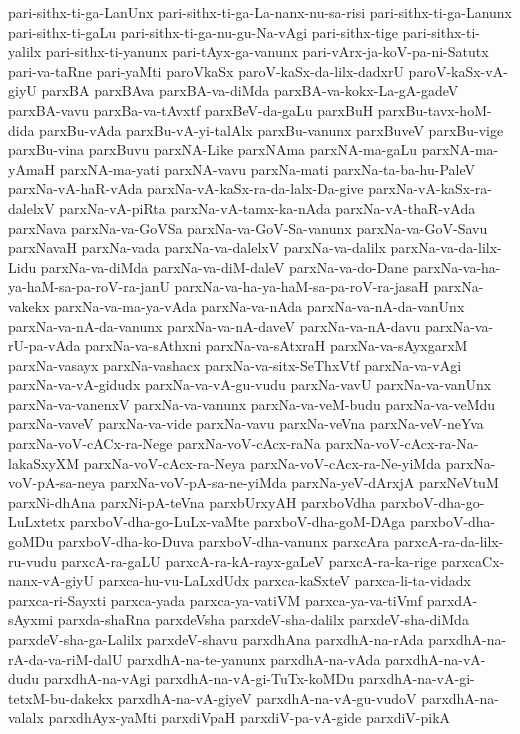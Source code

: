 {pari-sithx-ti-ga-LanUnx
pari-sithx-ti-ga-La-nanx-nu-sa-risi
pari-sithx-ti-ga-Lanunx
pari-sithx-ti-gaLu
pari-sithx-ti-ga-nu-gu-Na-vAgi
pari-sithx-tige
pari-sithx-ti-yalilx
pari-sithx-ti-yanunx
pari-tAyx-ga-vanunx
pari-vArx-ja-koV-pa-ni-Satutx
pari-va-taRne
pari-yaMti
paroVkaSx
paroV-kaSx-da-lilx-dadxrU
paroV-kaSx-vA-giyU
parxBA
parxBAva
parxBA-va-diMda
parxBA-va-kokx-La-gA-gadeV
parxBA-vavu
parxBa-va-tAvxtf
parxBeV-da-gaLu
parxBuH
parxBu-tavx-hoM-dida
parxBu-vAda
parxBu-vA-yi-talAlx
parxBu-vanunx
parxBuveV
parxBu-vige
parxBu-vina
parxBuvu
parxNA-Like
parxNAma
parxNA-ma-gaLu
parxNA-ma-yAmaH
parxNA-ma-yati
parxNA-vavu
parxNa-mati
parxNa-ta-ba-hu-PaleV
parxNa-vA-haR-vAda
parxNa-vA-kaSx-ra-da-lalx-Da-give
parxNa-vA-kaSx-ra-dalelxV
parxNa-vA-piRta
parxNa-vA-tamx-ka-nAda
parxNa-vA-thaR-vAda
parxNava
parxNa-va-GoVSa
parxNa-va-GoV-Sa-vanunx
parxNa-va-GoV-Savu
parxNavaH
parxNa-vada
parxNa-va-dalelxV
parxNa-va-dalilx
parxNa-va-da-lilx-Lidu
parxNa-va-diMda
parxNa-va-diM-daleV
parxNa-va-do-Dane
parxNa-va-ha-ya-haM-sa-pa-roV-ra-janU
parxNa-va-ha-ya-haM-sa-pa-roV-ra-jasaH
parxNa-vakekx
parxNa-va-ma-ya-vAda
parxNa-va-nAda
parxNa-va-nA-da-vanUnx
parxNa-va-nA-da-vanunx
parxNa-va-nA-daveV
parxNa-va-nA-davu
parxNa-va-rU-pa-vAda
parxNa-va-sAthxni
parxNa-va-sAtxraH
parxNa-va-sAyxgarxM
parxNa-vasayx
parxNa-vashacx
parxNa-va-sitx-SeThxVtf
parxNa-va-vAgi
parxNa-va-vA-gidudx
parxNa-va-vA-gu-vudu
parxNa-vavU
parxNa-va-vanUnx
parxNa-va-vanenxV
parxNa-va-vanunx
parxNa-va-veM-budu
parxNa-va-veMdu
parxNa-vaveV
parxNa-va-vide
parxNa-vavu
parxNa-veVna
parxNa-veV-neYva
parxNa-voV-cACx-ra-Nege
parxNa-voV-cAcx-raNa
parxNa-voV-cAcx-ra-Na-lakaSxyXM
parxNa-voV-cAcx-ra-Neya
parxNa-voV-cAcx-ra-Ne-yiMda
parxNa-voV-pA-sa-neya
parxNa-voV-pA-sa-ne-yiMda
parxNa-yeV-dArxjA
parxNeVtuM
parxNi-dhAna
parxNi-pA-teVna
parxbUrxyAH
parxboVdha
parxboV-dha-go-LuLxtetx
parxboV-dha-go-LuLx-vaMte
parxboV-dha-goM-DAga
parxboV-dha-goMDu
parxboV-dha-ko-Duva
parxboV-dha-vanunx
parxcAra
parxcA-ra-da-lilx-ru-vudu
parxcA-ra-gaLU
parxcA-ra-kA-rayx-gaLeV
parxcA-ra-ka-rige
parxcaCx-nanx-vA-giyU
parxca-hu-vu-LaLxdUdx
parxca-kaSxteV
parxca-li-ta-vidadx
parxca-ri-Sayxti
parxca-yada
parxca-ya-vatiVM
parxca-ya-va-tiVmf
parxdA-sAyxmi
parxda-shaRna
parxdeVsha
parxdeV-sha-dalilx
parxdeV-sha-diMda
parxdeV-sha-ga-Lalilx
parxdeV-shavu
parxdhAna
parxdhA-na-rAda
parxdhA-na-rA-da-va-riM-dalU
parxdhA-na-te-yanunx
parxdhA-na-vAda
parxdhA-na-vA-dudu
parxdhA-na-vAgi
parxdhA-na-vA-gi-TuTx-koMDu
parxdhA-na-vA-gi-tetxM-bu-dakekx
parxdhA-na-vA-giyeV
parxdhA-na-vA-gu-vudoV
parxdhA-na-valalx
parxdhAyx-yaMti
parxdiVpaH
parxdiV-pa-vA-gide
parxdiV-pikA
}
